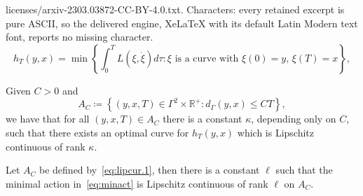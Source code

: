 \documentclass[10pt,a4paper]{amsart}
\newcommand{\Rds}{\mathds R}
\begin{document}
licenses/arxiv-2303.03872-CC-BY-4.0.txt. Characters: every retained excerpt is pure ASCII, so the delivered engine, XeLaTeX with its default Latin Modern text font, reports no missing character.
    \begin{equation}\label{eq:minact}
        h_T(y,x)=\min\left\{\int_0^T L\left(\xi,\dot\xi\right)d\tau:\text{$\xi$ is a curve with $\xi(0)=y$, $\xi(T)=x$}\right\},
    \end{equation}

    \begin{lem}\label{lipcur}
        Given $C>0$ and
        \begin{equation}\label{eq:lipcur.1}
            A_C\coloneqq\left\{(y,x,T)\in\Gamma^2\times\Rds^+:d_\Gamma(y,x)\le CT\right\},
        \end{equation}
        we have that for all $(y,x,T)\in A_C$ there is a constant $\kappa$, depending only on $C$, such that there exists an optimal curve for $h_T(y,x)$ which is Lipschitz continuous of rank $\kappa$.
    \end{lem}

    \begin{prop}\label{minactlip}
        Let $A_C$ be defined by~\cref{eq:lipcur.1}, then there is a constant $\ell$ such that the minimal action in~\cref{eq:minact} is Lipschitz continuous of rank $\ell$ on $A_C$.
    \end{prop}
\end{document}
